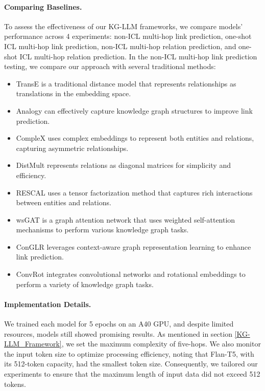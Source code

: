 \documentclass[pmlr]{jmlr}%
\begin{document}
\paragraph{Comparing Baselines.} To assess the effectiveness of our KG-LLM frameworks, we compare models' performance across 4 experiments: non-ICL multi-hop link prediction, one-shot ICL multi-hop link prediction, non-ICL multi-hop relation prediction, and one-shot ICL multi-hop relation prediction. In the non-ICL multi-hop link prediction testing, we compare our approach with several traditional methods:
\begin{itemize}
    \item TransE \citep{bordes2013translating} is a traditional distance model that represents relationships as translations in the embedding space.
    \item Analogy \citep{liu2017analogical} can effectively capture knowledge graph structures to improve link prediction.
    \item CompleX \citep{trouillon2016complex} uses complex embeddings to represent both entities and relations, capturing asymmetric relationships.
    \item DistMult \citep{yang2014embedding} represents relations as diagonal matrices for simplicity and efficiency.
    \item RESCAL \citep{nickel2016holographic} uses a tensor factorization method that captures rich interactions between entities and relations.
    \item wsGAT \citep{grassia2022wsgat} is a graph attention network that uses weighted self-attention mechanisms to perform various knowledge graph tasks.
    \item ConGLR \citep{lin2022incorporating} leverages context-aware graph representation learning to enhance link prediction.
    \item ConvRot \citep{le2023knowledge} integrates convolutional networks and rotational embeddings to perform a variety of knowledge graph tasks.
\end{itemize}


\paragraph{Implementation Details.}

We trained each model for 5 epochs on an A40 GPU, and despite limited resources, models still showed promising results. As mentioned in section \ref{KG-LLM_Framework}, we set the maximum complexity of five-hops. We also monitor the input token size to optimize processing efficiency, noting that Flan-T5, with its 512-token capacity, had the smallest token size. Consequently, we tailored our experiments to ensure that the maximum length of input data did not exceed 512 tokens.
\end{document}
